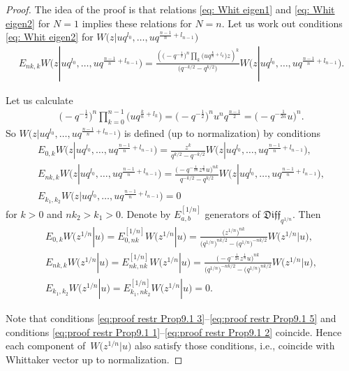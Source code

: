 \documentclass[pdftex]{sigma}
\numberwithin{equation}{section}
\theoremstyle{definition}
\newcommand{\half}{\frac{1}{2}}
\newcommand{\qd}[1]{ \mathfrak{Diff}_{q^{#1}} }
\begin{document}
\begin{proof}
The idea of the proof is that relations \eqref{eq: Whit eigen1} and \eqref{eq: Whit eigen2} for $N=1$ implies these relations for $N=n$. Let us work out conditions \eqref{eq: Whit eigen2} for $W\big(z | u q^{ l_0}, \dots ,u q^{\frac{n-1}{n}+ l_{n-1}}\big)$
\begin{gather*}
E_{nk,k} W\big(z | u q^{ l_0}, \dots ,u q^{\frac{n-1}{n}+ l_{n-1}}\big) = \frac{\left( \big({-}q^{-\half}
\big)^n \prod_k \big( u q^{\frac{k}{n}+ l_k} \big) z \right)^{k}}{\big(q^{-k/2}-q^{k/2}\big)} W\big(z | u q^{ l_0}, \dots ,u q^{\frac{n-1}{n}+ l_{n-1}}\big).
\end{gather*}

Let us calculate
\begin{gather*}
\big({-}q^{-\half} \big)^n \prod_{k=0}^{n-1} \big( u q^{\frac{k}{n}+ l_k} \big) = \big({-}q^{-\half}\big)^n u^n q^{\frac{n-1}{2}} = \big({-}q^{-\frac{1}{2n}} u \big)^n.
\end{gather*}
So $ W\big(z | u q^{ l_0}, \dots ,u q^{\frac{n-1}{n}+ l_{n-1}}\big)$ is defined (up to normalization) by conditions
\begin{gather}
E_{0,k} W\big(z | u q^{ l_0}, \dots ,u q^{\frac{n-1}{n}+ l_{n-1}}\big) = \frac{z^k}{q^{k/2}-q^{-k/2}} W\big(z | u q^{ l_0}, \dots ,u q^{\frac{n-1}{n}+ l_{n-1}}\big), \label{eq:proof restr Prop9.1 1}\\
E_{nk,k} W\big(z | u q^{ l_0}, \dots ,u q^{\frac{n-1}{n}+ l_{n-1}}\big) = \frac{\big({-}q^{-\frac{1}{2n}} z^{\frac{1}{n}}u \big)^{nk} }{q^{-k/2}-q^{k/2}} W\big(z | u q^{ l_0}, \dots ,u q^{\frac{n-1}{n}+ l_{n-1}}\big),\\
E_{k_1, k_2} W\big(z | u q^{ l_0}, \dots ,u q^{\frac{n-1}{n}+ l_{n-1}}\big) = 0
\label{eq:proof restr Prop9.1 2}
\end{gather}
for $k>0$ and $nk_2> k_1 >0$. Denote by $E^{[1/n]}_{a,b}$ generators of $\qd{1/n}$. Then
\begin{gather}
E_{0,k} W\big(z^{1/n}|u\big) = E^{[1/n]}_{0,nk} W\big(z^{1/n}|u\big) =
\frac {\big(z^{1/n} \big)^{nk}} { \big( q^{1/n} \big)^{nk/2}-\big( q^{1/n} \big)^{-nk/2} }
 W\big(z^{1/n}|u\big), \label{eq:proof restr Prop9.1 3} \\
E_{nk,k} W\big(z^{1/n}|u\big) = E^{[1/n]}_{nk,nk} W\big(z^{1/n}|u\big) = \frac{\big({-}q^{-\frac{1}{2n}} z^{\frac{1}{n}}u \big)^{nk} }{\big( q^{1/n} \big)^{-nk/2}-\big( q^{1/n} \big)^{nk/2}} W\big(z^{1/n}|u\big), \label{eq:proof restr Prop9.1 4} \\
E_{k_1, k_2} W\big(z^{1/n}|u\big) = E^{[1/n]}_{k_1, n k_2} W\big(z^{1/n}|u\big) =0.
\label{eq:proof restr Prop9.1 5}
\end{gather}

Note that conditions \eqref{eq:proof restr Prop9.1 3}--\eqref{eq:proof restr Prop9.1 5} and conditions \eqref{eq:proof restr Prop9.1 1}--\eqref{eq:proof restr Prop9.1 2} coincide. Hence each component of~$W\big(z^{1/n}|u\big)$ also satisfy those conditions, i.e., coincide with Whittaker vector up to normalization.
\end{proof}
\end{document}
